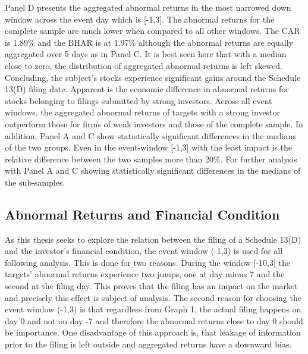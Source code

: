 \documentclass[12pt]{article}
\begin{document}
Panel D presents the aggregated abnormal returns in the most narrowed down window across the event day which is [-1,3]. The abnormal returns for the complete sample are much lower when compared to all other windows. The CAR is 1.89\% and the BHAR is at 1.97\% although the abnormal returns are equally aggregated over 5 days as in Panel C. It is best seen here that with a median close to zero, the distribution of aggregated abnormal returns is left skewed.
Concluding, the subject's stocks experience significant gains around the Schedule 13(D) filing date. Apparent is the economic difference in abnormal returns for stocks belonging to filings submitted by strong investors. Across all event windows, the aggregated abnormal returns of targets with a strong investor outperform those for firms of weak investors and those of the complete sample. In addition, Panel A and C  show statistically significant differences in the medians of the two groups. Even in the event-window [-1,3] with the least impact is the relative difference between the two samples more than 20\%. 
For further analysis with Panel A and C showing statistically significant differences in the medians of the sub-samples. 

\pagebreak

\subsection{Abnormal Returns and Financial Condition}

As this thesis seeks to explore the relation between the filing of a Schedule 13(D) and the investor's financial condition, the event window (-1,3) is used for all following analysis. This is done for two reasons. During the window [-10,3] the targets' abnormal returns experience two jumps, one at day minus 7 and the second at the filing day. This proves that the filing has an impact on the market and precisely this effect is subject of analysis. The second reason for choosing the event window (-1,3) is that regardless from Graph 1, the actual filing happens on day 0 and not on day -7 and therefore the abnormal returns close to day 0 should be importance. One disadvantage of this approach is, that leakage of information prior to the filing is left outside and aggregated returns have a downward bias.
  
\end{document}
